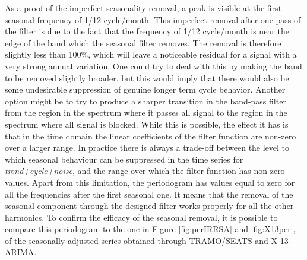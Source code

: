 \documentclass[english,blauw]{cbsdiscussionpaper}
\begin{document}
As a proof of the imperfect seasonality removal, a peak is visible at the first seasonal frequency of 1/12 cycle/month. This imperfect removal after one pass of the filter is due to the fact that the frequency of 1/12 cycle/month is near the edge of the band which the seasonal filter removes. The removal is therefore slightly less than 100\%, which will leave a noticeable residual for a signal with a very strong annual variation. One could try to deal with this by making the band to be removed slightly broader, but this would imply that there would also be some undesirable suppression of genuine longer term cycle behavior. Another option might be to try to produce a sharper transition in the band-pass filter from the region in the spectrum where it passes all signal to the region in the spectrum where all signal is blocked. While this is possible, the effect it has is that in the time domain the linear coefficients of the filter function are non-zero over a larger range. In practice there is always a trade-off between the level to which seasonal behaviour can be suppressed in the time series for \textit{trend+cycle+noise}, and the range over which the filter function has non-zero values. Apart from this limitation, the periodogram has values equal to zero for all the frequencies after the first seasonal one. It means that the removal of the seasonal component through the designed filter works properly for all the other harmonics. To confirm the efficacy of the seasonal removal, it is possible to compare this periodogram to the one in Figure \ref{fig:perIRRSA} and \ref{fig:X13per}, of the seasonally adjusted series obtained through TRAMO/SEATS and X-13-ARIMA.\\
\end{document}
